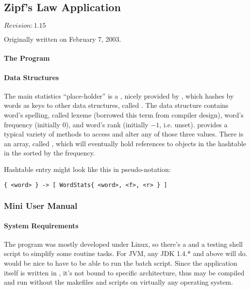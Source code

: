 \subsection{Zipf's Law Application}

$Revision: 1.15 $

Originally written on February 7, 2003.

\paragraph{The Program}


\paragraph{Data Structures}

The main statistics ``place-holder'' is a  , nicely
provided by {\java}, which hashes by words as keys to other
data structures, called . The  data structure
contains word's spelling, called lexeme (borrowed this term
from compiler design), word's frequency (initially $0$), and
word's rank (initially $-1$, i.e. unset).  provides a typical
variety of methods to access and alter any of those three values.
There is an array, called , which will eventually
hold references to  objects in the  hashtable in
the sorted by the frequency.

Hashtable entry might look like this in pseudo-notation:

\verb+{ <word> } -> [ WordStats{ <word>, <f>, <r> } ]+

\subsubsection{Mini User Manual}

\paragraph{System Requirements}

The program was mostly developed under Linux, so there's
a  and a testing shell script to simplify some routine tasks.
For JVM, any JDK 1.4.* and above will do.  would be nice
to have to be able to run the batch script. Since the application
itself is written in {\java}, it's not bound to specific architecture,
thus may be compiled and run without the makefiles and scripts
on virtually any operating system.

